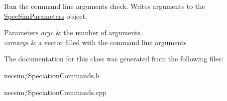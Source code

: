 Run the command line arguments check. Writes arguments to the \hyperlink{struct_spec_sim_parameters}{Spec\+Sim\+Parameters} object. 


\begin{DoxyParams}{Parameters}
{\em argc} & the number of arguments. \\
\hline
{\em comargs} & a vector filled with the command line arguments \\
\hline
\end{DoxyParams}


The documentation for this class was generated from the following files\+:\begin{DoxyCompactItemize}
\item 
necsim/Speciation\+Commands.\+h\item 
necsim/Speciation\+Commands.\+cpp\end{DoxyCompactItemize}
